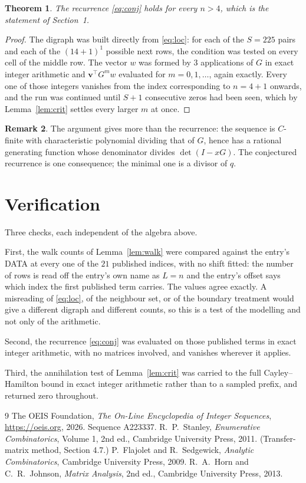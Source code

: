 \documentclass[11pt,a4paper]{article}
\theoremstyle{plain}
\newtheorem{theorem}{Theorem}
\theoremstyle{definition}
\newtheorem{remark}[theorem]{Remark}
\begin{document}
\begin{theorem}
The recurrence \eqref{eq:conj} holds for every $n>4$, which is the statement of
Section~1.
\end{theorem}

\begin{proof}
The digraph was built directly from \eqref{eq:loc}: for each of the $S=225$ pairs and each
of the $(14+1)^{1}$ possible next rows, the condition was tested on every cell of
the middle row. The vector $w$ was formed by $3$ applications of $G$ in exact integer
arithmetic and $\mathbf{v}^{\!\top}G^{m}w$ evaluated for $m=0,1,\dots$, again exactly.
Every one of those integers vanishes from the index corresponding to $n=4+1$ onwards,
and the run was continued until $S+1$ consecutive zeros had been seen, which by
Lemma~\ref{lem:crit} settles every larger $m$ at once.
\end{proof}

\begin{remark}
The argument gives more than the recurrence: the sequence is $C$-finite with characteristic
polynomial dividing that of $G$, hence has a rational generating function whose denominator
divides $\det(I-xG)$. The conjectured recurrence is one consequence; the minimal one is a
divisor of $q$.
\end{remark}

\section{Verification}

Three checks, each independent of the algebra above.

First, the walk counts of Lemma~\ref{lem:walk} were compared against the entry's DATA at
every one of the $21$ published indices, with no shift fitted: the number of rows is
read off the entry's own name as $L=n$ and the entry's offset says which index the first
published term carries. The values agree exactly. A misreading of \eqref{eq:loc}, of the
neighbour set, or of the boundary treatment would give a different digraph and different
counts, so this is a test of the modelling and not only of the arithmetic.

Second, the recurrence \eqref{eq:conj} was evaluated on those published terms in exact
integer arithmetic, with no matrices involved, and vanishes wherever it applies.

Third, the annihilation test of Lemma~\ref{lem:crit} was carried to the full
Cayley--Hamilton bound in exact integer arithmetic rather than to a sampled prefix, and
returned zero throughout.

\begin{thebibliography}{9}
 The OEIS Foundation, \emph{The On-Line Encyclopedia of Integer
Sequences}, \url{https://oeis.org}, 2026. Sequence A223337.
 R.~P.~Stanley, \emph{Enumerative Combinatorics}, Volume 1, 2nd ed.,
Cambridge University Press, 2011. (Transfer-matrix method, Section 4.7.)
 P.~Flajolet and R.~Sedgewick, \emph{Analytic Combinatorics}, Cambridge
University Press, 2009.
 R.~A.~Horn and C.~R.~Johnson, \emph{Matrix Analysis}, 2nd ed., Cambridge
University Press, 2013.
\end{thebibliography}
\end{document}
